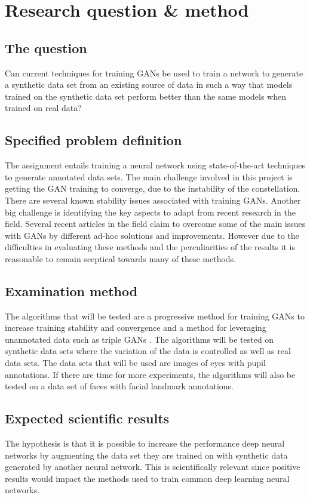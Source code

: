 \documentclass[a4paper]{article}
\begin{document}
\section{Research question \& method}
\subsection{The question}
Can current techniques for training GANs be used to train a network to generate a synthetic data set from
an existing source of data in such a way that models trained on the synthetic
data set perform better than the same models when trained on real data?

\subsection{Specified problem definition}
The assignment entails training a neural network using state-of-the-art
techniques to generate annotated data sets. The main challenge involved in this
project is getting the GAN training to converge, due to the instability of the
constellation. There are several known stability issues associated with training
GANs. Another big challenge is identifying the key aspects to adapt from recent
research in the field. Several recent articles in the field claim to overcome
some of the main issues with GANs by different ad-hoc solutions and improvements.
However due to the difficulties in evaluating these methods and the perculiarities of the results it
is reasonable to remain sceptical towards many of these
methods.

\subsection{Examination method}
The algorithms that will be tested are a progressive method for training GANs
\cite{karras2017progressive} to increase training stability and convergence and
a method for leveraging unannotated data such as triple GANs
\cite{li2017triple}. The algorithms will be tested on synthetic data sets where
the variation of the data is controlled as well as real data sets. The data sets
that will be used are images of eyes with pupil annotations. If there are time
for more experiments, the algorithms will also be tested on a data set of faces
with facial landmark annotations. 

\subsection{Expected scientific results}
The hypothesis is that it is possible to increase the performance deep neural networks by augmenting the data set they are trained on with synthetic data generated by another neural network. 
This is scientifically relevant since positive results would impact the methods used to train common deep learning neural networks. 
\end{document}

